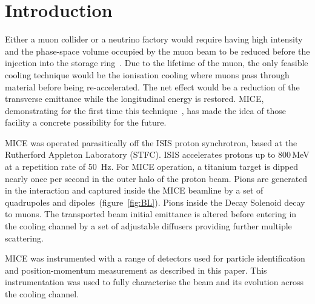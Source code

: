 \section{Introduction}
\label{Sect:Intro}

Either a muon collider or a neutrino factory would require having high intensity and the phase-space volume occupied by the muon beam to be reduced before the injection into the storage ring~\cite{Geer:1998PhRvD..57.6989G}.
Due to the lifetime of the muon, the only feasible cooling technique would be the ionisation cooling \cite{Neuffer:1983jr} where muons pass through material before being re-accelerated. The net effect would be a reduction of the transverse emittance while the longitudinal energy is restored.
MICE, demonstrating for the first time this technique~\cite{Bogomilov:2019kfj}, has made the idea of those facility a concrete possibility for the future.
  
  
  
MICE was operated parasitically off the ISIS proton synchrotron, based at the Rutherford Appleton Laboratory (STFC).
ISIS accelerates protons up to 800\,MeV at a repetition rate of 50~Hz. For MICE operation, a titanium target is dipped nearly once per second in the outer halo of the proton beam.
Pions are generated in the interaction and captured inside the MICE beamline by a set of quadrupoles and dipoles~(figure~\ref{fig:BL}). Pions inside the Decay Solenoid decay to muons.
The transported beam initial emittance is altered before entering in the cooling channel by a set of adjustable diffusers providing further multiple scattering.

MICE was instrumented with a range of detectors used for particle identification and position-momentum measurement as described in this paper. This instrumentation was used to fully characterise the beam and its evolution across the cooling channel.
